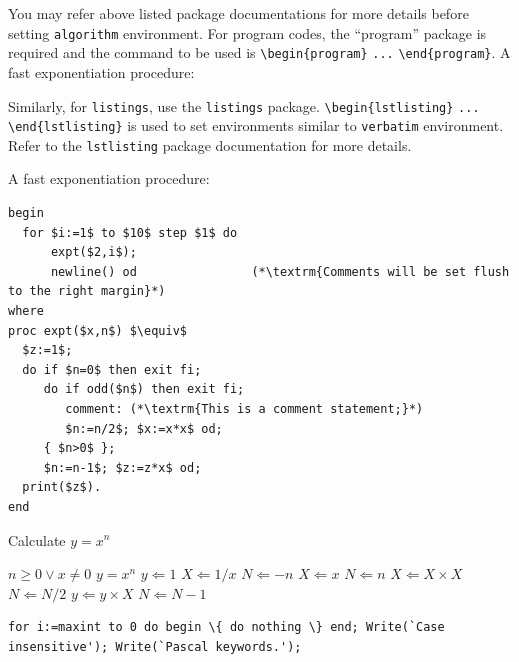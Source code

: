 \documentclass[sn-basic,lineno,pdflatex]{sn-jnl}
\theoremstyle{remark}
\theoremstyle{definition}
\begin{document}
You may refer above listed package documentations for more details
before setting \texttt{algorithm} environment. For program codes, the
``program'' package is required and the command to be used is
\texttt{\textbackslash{}begin\{program\}} \texttt{...}
\texttt{\textbackslash{}end\{program\}}. A fast exponentiation
procedure:

Similarly, for \texttt{listings}, use the \texttt{listings} package.
\texttt{\textbackslash{}begin\{lstlisting\}} \texttt{...}
\texttt{\textbackslash{}end\{lstlisting\}} is used to set environments
similar to \texttt{verbatim} environment. Refer to the
\texttt{lstlisting} package documentation for more details.

A fast exponentiation procedure:

\begin{lstlisting}
begin
  for $i:=1$ to $10$ step $1$ do
      expt($2,i$);  
      newline() od                (*\textrm{Comments will be set flush to the right margin}*)
where
proc expt($x,n$) $\equiv$
  $z:=1$;
  do if $n=0$ then exit fi;
     do if odd($n$) then exit fi;                 
        comment: (*\textrm{This is a comment statement;}*)
        $n:=n/2$; $x:=x*x$ od;
     { $n>0$ };
     $n:=n-1$; $z:=z*x$ od;
  print($z$). 
end
\end{lstlisting}

\begin{algorithm}
\caption{Calculate $y = x^n$}\label{algo1}
\begin{algorithmic}[1]
\Require $n \geq 0 \vee x \neq 0$
\Ensure $y = x^n$ 
\State $y \Leftarrow 1$
\label{algln2}
        \State $X \Leftarrow 1 / x$
        \State $N \Leftarrow -n$
\Else
        \State $X \Leftarrow x$
        \State $N \Leftarrow n$
\EndIf
{}
            \State $X \Leftarrow X \times X$
            \State $N \Leftarrow N / 2$
        \Else[$N$ is odd]
            \State $y \Leftarrow y \times X$
            \State $N \Leftarrow N - 1$
        \EndIf
\EndWhile
\end{algorithmic}
\end{algorithm}

\begin{minipage}{\hsize}

\lstset{frame=single,framexleftmargin=-1pt,framexrightmargin=-17pt,framesep=12pt,linewidth=0.98\textwidth,language=pascal}

\begin{lstlisting}
for i:=maxint to 0 do begin \{ do nothing \} end; Write(`Case
insensitive'); Write(`Pascal keywords.');

\end{lstlisting}

\end{minipage}
\end{document}
